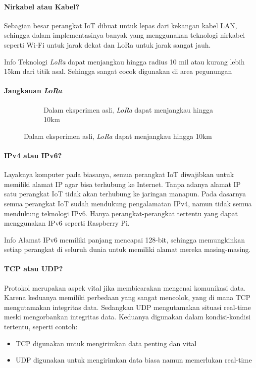 \begin{frame}{\insertsectionhead}
	\framesubtitle{Nirkabel atau Kabel?}
	\justifying
	Sebagian besar perangkat IoT dibuat untuk lepas dari kekangan kabel LAN, sehingga dalam implementasinya banyak yang menggunakan teknologi nirkabel seperti Wi-Fi untuk jarak dekat dan LoRa untuk jarak sangat jauh.
	\vfill
	\begin{block}{Info}
		Teknologi \textit{LoRa} dapat menjangkau hingga radius 10 mil atau kurang lebih 15km dari titik asal. Sehingga sangat cocok digunakan di area pegunungan
	\end{block}
\end{frame}

\begin{frame}{\insertsectionhead}
	\framesubtitle{Jangkauan \textit{LoRa}}
	\justifying
	\begin{figure}[ht!]
		\begin{subfigure}[b]{0.6\textwidth}
			\caption*{Dalam eksperimen asli, \textit{LoRa} dapat menjangkau hingga 10km}
		\end{subfigure}
	\end{figure}
\end{frame}

\begin{frame}{\insertsectionhead}
	\framesubtitle{IPv4 atau IPv6?}
	\justifying
	Layaknya komputer pada biasanya, semua perangkat IoT diwajibkan untuk memiliki alamat IP agar bisa terhubung ke Internet. Tanpa adanya alamat IP satu perangkat IoT tidak akan terhubung ke jaringan manapun.
	\vfill
	Pada dasarnya semua perangkat IoT sudah mendukung pengalamatan IPv4, namun tidak semua mendukung teknologi IPv6. Hanya perangkat-perangkat tertentu yang dapat menggunakan IPv6 seperti Raspberry Pi.
	\vfill
	\begin{block}{Info}
		Alamat IPv6 memiliki panjang mencapai 128-bit, sehingga memungkinkan setiap perangkat di seluruh dunia untuk memiliki alamat mereka masing-masing.
	\end{block}
\end{frame}

\begin{frame}{\insertsectionhead}
	\framesubtitle{TCP atau UDP?}
	\justifying
	Protokol merupakan aspek vital jika membicarakan mengenai komunikasi data. Karena keduanya memiliki perbedaan yang sangat mencolok, yang di mana TCP mengutamakan integritas data. Sedangkan UDP mengutamakan situasi real-time meski mengorbankan integritas data.
	\vfill
	Keduanya digunakan dalam kondisi-kondisi tertentu, seperti contoh:
	\begin{itemize}
		\item TCP digunakan untuk mengirimkan data penting dan vital
		\item UDP digunakan untuk mengirimkan data biasa namun memerlukan real-time
	\end{itemize}
\end{frame}

